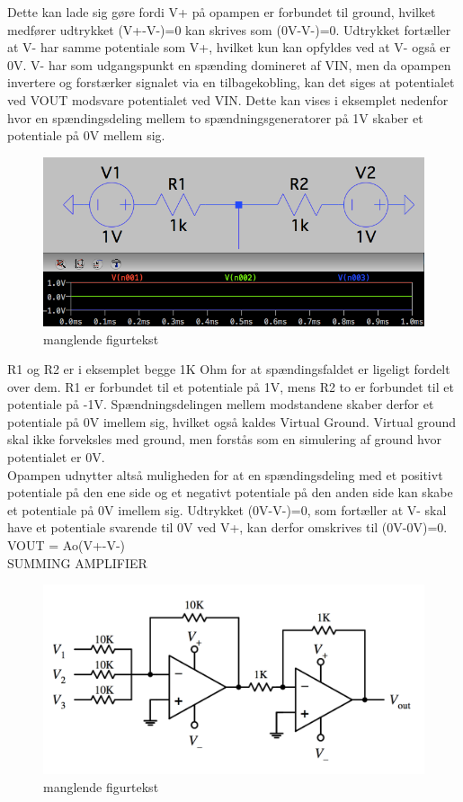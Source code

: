 %
Dette kan lade sig gøre fordi V+ på opampen er forbundet til ground, hvilket medfører udtrykket (V+-V-)=0 kan skrives som (0V-V-)=0. Udtrykket fortæller at V- har samme potentiale som V+, hvilket kun kan opfyldes ved at V- også er 0V. V- har som udgangspunkt en spænding domineret af VIN, men da opampen invertere og forstærker signalet via en tilbagekobling, kan det siges at potentialet ved VOUT modsvare potentialet ved VIN. Dette kan vises i eksemplet nedenfor hvor en spændingsdeling mellem to spændningsgeneratorer på 1V skaber et potentiale på 0V mellem sig.
%
\begin{figure}[H]
\centering
\includegraphics[resolution=300,width=\textwidth]{Figure/Introduktion/PotentialeSpaendingsgeneratorer.png}
\caption{manglende figurtekst}
\label{fig:PotentialeSpaendingsgeneratorer}
\end{figure}
\noindent
%
R1 og R2 er i eksemplet begge 1K Ohm for at spændingsfaldet er ligeligt fordelt over dem. R1 er forbundet til et potentiale på 1V, mens R2 to er forbundet til et potentiale på -1V. Spændningsdelingen mellem modstandene skaber derfor et potentiale på 0V imellem sig, hvilket også kaldes Virtual Ground. Virtual ground skal ikke forveksles med ground, men forstås som en simulering af ground hvor potentialet er 0V.\\
%
Opampen udnytter altså  muligheden for at en spændingsdeling med et positivt potentiale på den ene side og et negativt potentiale på den anden side kan skabe et potentiale på 0V imellem sig. Udtrykket (0V-V-)=0, som fortæller at V- skal have et potentiale svarende til 0V ved V+, kan derfor omskrives til (0V-0V)=0. 
VOUT = Ao(V+-V-)\\
%
SUMMING AMPLIFIER
%
\begin{figure}[H]
\centering
\includegraphics[resolution=300,width=\textwidth]{Figure/Introduktion/SumationskoblingOpAmp.png}
\caption{manglende figurtekst}
\label{fig:SumationskoblingOpAmp}
\end{figure}
\noindent
%